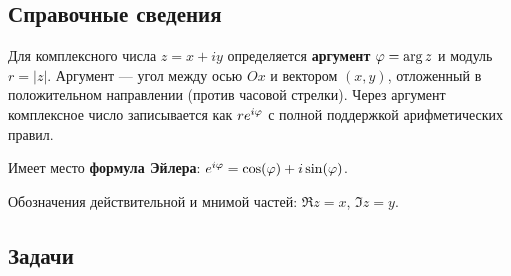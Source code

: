 \subsection*{Справочные сведения}

\noindent Для комплексного числа $z=x+iy$ определяется \textbf{аргумент} $\varphi=\arg z$ и модуль $r=|z|$.
Аргумент --- угол между осью $Ox$ и вектором $(x,y)$, отложенный в положительном направлении (против часовой стрелки). Через аргумент комплексное число записывается как $re^{i\varphi}$ с полной поддержкой арифметических правил.

Имеет место \textbf{формула Эйлера}: $e^{i\varphi} = \cos(\varphi)+i\sin(\varphi)$. 

Обозначения действительной и мнимой частей: $\Re z=x$, $\Im z =y$.



\subsection*{Задачи}

